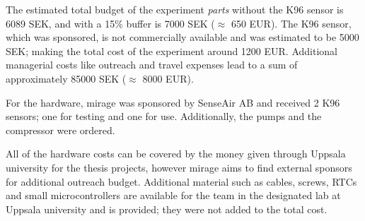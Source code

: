 \documentclass[
  a4paper,
  11pt,
  openany,
  parskip,
  toc=totoc,
  listof=totoc,
  bibliography=totoc
]{scrreprt}
\begin{document}
The estimated total budget of the experiment \emph{parts} without the K96 sensor is 6089 SEK, and with a 15\% buffer is 7000 SEK ($\approx$ 650 EUR). The K96 sensor, which was sponsored, is not commercially available and was estimated to be 5000 SEK; making the total cost of the experiment around 1200 EUR. Additional managerial costs like outreach and travel expenses lead to a sum of approximately 85000 SEK ($\approx$ 8000 EUR).

For the hardware, \gls{mirage} was sponsored by SenseAir AB and received 2 K96 sensors; one for testing and one for use. Additionally, the pumps and the compressor were ordered.

All of the hardware costs can be covered by the money given through Uppsala university for the thesis projects, however \gls{mirage} aims to find external sponsors for additional outreach budget. Additional material such as cables, screws, RTCs and small microcontrollers are available for the team in the designated lab at Uppsala university and is provided; they were not added to the total cost.
\end{document}
